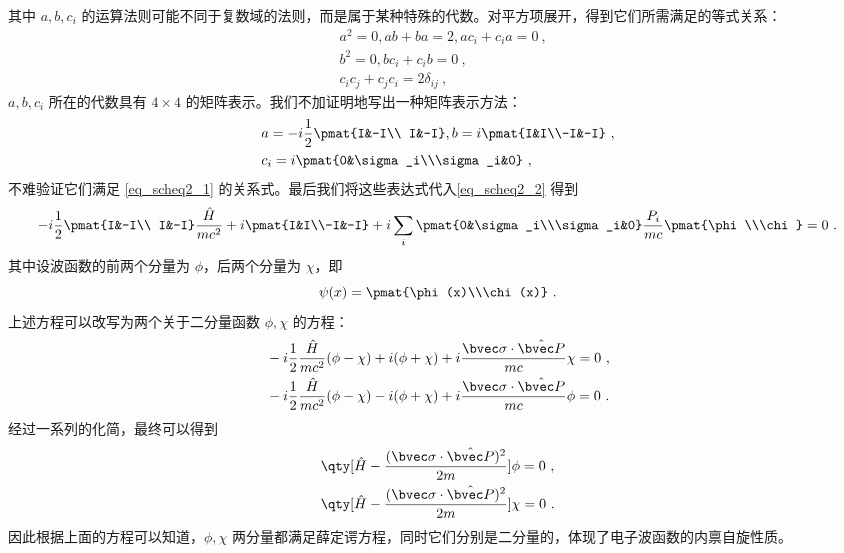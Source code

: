 其中 $a,b,c_i$ 的运算法则可能不同于复数域的法则，而是属于某种特殊的代数。对平方项展开，得到它们所需满足的等式关系：
\begin{equation}\label{eq_scheq2_1}
\begin{aligned}
&a^2=0,ab+ba=2,ac_i+c_ia=0~,\\
&b^2=0,bc_i+c_ib=0~,\\
&c_ic_j+c_jc_i=2\delta_{ij}~,
\end{aligned}
\end{equation}
$a,b,c_i$ 所在的代数具有 $4\times 4$ 的矩阵表示。我们不加证明地写出一种矩阵表示方法：
\begin{equation}
\begin{aligned}
&a=-i\frac{1}{2}\pmat{I&-I\\ I&-I},b=i\pmat{I&I\\-I&-I}~,\\
&c_i=i\pmat{0&\sigma_i\\\sigma_i&0}~,
\end{aligned}
\end{equation}
不难验证它们满足 \autoref{eq_scheq2_1} 的关系式。最后我们将这些表达式代入\autoref{eq_scheq2_2} 得到
\begin{equation}
-i\frac{1}{2}\pmat{I&-I\\ I&-I} \frac{\hat H}{mc^2}+i\pmat{I&I\\-I&-I}+i\sum_i\pmat{0&\sigma_i\\\sigma_i&0} \frac{P_i}{mc}\pmat{\phi\\\chi}=0~.
\end{equation}
其中设波函数的前两个分量为 $\phi$，后两个分量为 $\chi$，即
\begin{equation}\label{eq_scheq2_4}
\psi(x)=\pmat{\phi(x)\\\chi(x)}~.
\end{equation}
上述方程可以改写为两个关于二分量函数 $\phi,\chi$ 的方程：
\begin{equation}
\begin{aligned}
&-i\frac{1}{2}\frac{\hat H}{mc^2}(\phi-\chi)+i(\phi+\chi)+i\frac{\bvec \sigma\cdot \hat{\bvec P}}{mc}\chi=0~,\\
&-i\frac{1}{2}\frac{\hat H}{mc^2}(\phi-\chi)-i(\phi+\chi)+i\frac{\bvec \sigma\cdot \hat{\bvec P}}{mc}\phi=0~.
\end{aligned}
\end{equation}
经过一系列的化简，最终可以得到
\begin{equation}\label{eq_scheq2_3}
\begin{aligned}
&\qty[\hat H-\frac{(\bvec \sigma\cdot \hat{\bvec P})^2}{2m}]\phi=0~,\\
&
\qty[\hat H-\frac{(\bvec \sigma\cdot \hat{\bvec P})^2}{2m}]\chi=0~.
\end{aligned}
\end{equation}
因此根据上面的方程可以知道，$\phi,\chi$ 两分量都满足薛定谔方程，同时它们分别是二分量的，体现了电子波函数的内禀自旋性质。

